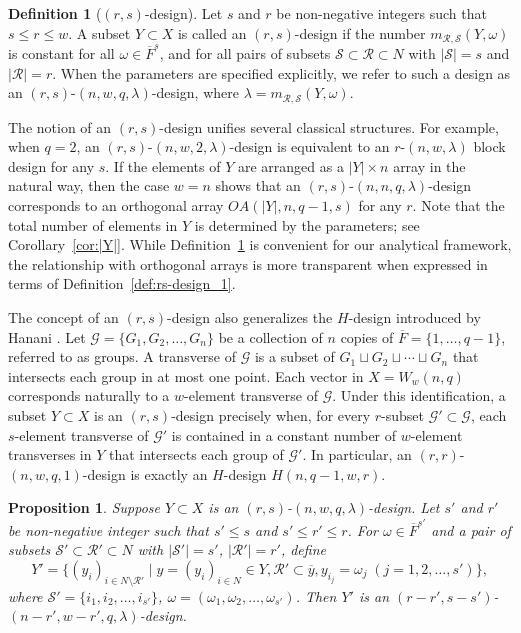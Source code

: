\documentclass[a4paper, 11pt]{article}
\newtheorem{proposition}[theorem]{Proposition}
\theoremstyle{definition}
\newtheorem{definition}[theorem]{Definition}
\begin{document}
\begin{definition}[$(r,s)$-design]\label{def:rs-design}
Let $s$ and $r$ be non-negative integers such that $s \le r \le w$.
A subset $Y \subset X$ is called an $(r,s)$-design if the number $m_{\mathcal{R},\mathcal{S}}(Y,\omega)$ is constant for all $\omega \in \overline{F}^{s}$, and for all pairs of subsets $\mathcal{S} \subset \mathcal{R}\subset N$ with $|\mathcal{S}| = s$ and $|\mathcal{R}| = r$.
When the parameters are specified explicitly, we refer to such a design as an $(r,s)$-$(n, w, q, \lambda)$-design, where $\lambda = m_{\mathcal{R},\mathcal{S}}(Y,\omega)$.
\end{definition}

The notion of an $(r,s)$-design unifies several classical structures.
For example, when $q=2$, an $(r,s)$-$(n, w, 2, \lambda)$-design is equivalent to an $r$-$(n,w,\lambda)$ block design for any $s$.
If the elements of $Y$ are arranged as a $|Y|\times n$ array in the natural way, then the case $w=n$ shows that an $(r,s)$-$(n, n, q, \lambda)$-design corresponds to an orthogonal array $OA(|Y|, n, q-1, s)$ for any $r$.
Note that the total number of elements in $Y$ is determined by the parameters; see Corollary~\ref{cor:|Y|}.
While Definition~\ref{def:rs-design} is convenient for our analytical framework, the relationship with orthogonal arrays is more transparent when expressed in terms of Definition~\ref{def:rs-design_1}.

The concept of an $(r,s)$-design also generalizes the $H$-design introduced by Hanani \cite{E97,Hanani63}.
Let $\mathcal{G} = \{ G_1, G_2, \ldots, G_n \}$ be a collection of $n$ copies of $\overline{F} = \{1,\ldots,q-1\}$, referred to as groups.
A transverse of $\mathcal{G}$ is a subset of $G_1 \sqcup G_2 \sqcup \cdots \sqcup G_n$ that intersects each group in at most one point.
Each vector in $X = W_w(n,q)$ corresponds naturally to a $w$-element transverse of $\mathcal{G}$.
Under this identification, a subset $Y \subset X$ is an $(r,s)$-design precisely when, for every $r$-subset $\mathcal{G}'\subset \mathcal{G}$, each $s$-element transverse of $\mathcal{G}'$ is contained in a constant number of $w$-element transverses in $Y$ that intersects each group of $\mathcal{G}'$.
In particular, an $(r,r)$-$(n,w,q,1)$-design is exactly an $H$-design $H(n,q-1,w,r)$.

\begin{proposition}\label{prop:derived}
Suppose $Y \subset X$ is an $(r,s)$-$(n, w, q, \lambda)$-design.
Let $s'$ and $r'$ be non-negative integer such that $s' \le s$ and $s' \le r' \le r$.
For $\omega \in \overline{F}^{s'}$ and a pair of subsets $\mathcal{S}' \subset \mathcal{R}' \subset N$ with
$|\mathcal{S}'| = s'$, $|\mathcal{R}'| = r'$, define
\[
Y' = \{ (y_i)_{i \in N \setminus \mathcal{R}'} \mid y = (y_i)_{i \in N} \in Y, \mathcal{R}' \subset \overline{y}, y_{i_j} = \omega_j \; (j = 1,2,\ldots,s')\},
\]
where $\mathcal{S}' = \{i_1,i_2,\ldots,i_{s'}\}$, $\omega = (\omega_1, \omega_2, \ldots, \omega_{s'})$.
Then $Y'$ is an $(r-r',s-s')$-$(n-r',w-r',q,\lambda)$-design.
\end{proposition}
\end{document}
